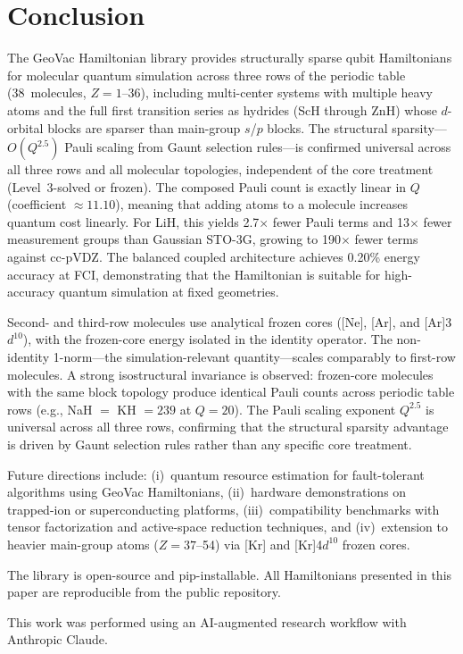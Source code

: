 \documentclass[twocolumn,pra,amsmath,amssymb,superscriptaddress]{revtex4-2}
\begin{document}
\section{Conclusion}
\label{sec:conclusion}

The GeoVac Hamiltonian library provides structurally sparse qubit
Hamiltonians for molecular quantum simulation across three rows
of the periodic table (38~molecules, $Z = 1$--36), including
multi-center systems with multiple heavy atoms and the full first
transition series as hydrides (ScH through ZnH) whose $d$-orbital blocks are sparser than
main-group $s$/$p$ blocks.  The
structural sparsity---$O(Q^{2.5})$ Pauli scaling from Gaunt selection
rules---is confirmed universal across all three rows and all molecular
topologies, independent of the core treatment (Level~3-solved or frozen).
The composed Pauli count is exactly linear in $Q$ (coefficient
$\approx 11.10$), meaning that adding atoms to a molecule increases
quantum cost linearly.
For LiH, this yields 2.7$\times$ fewer Pauli terms
and 13$\times$ fewer measurement groups than Gaussian STO-3G, growing
to 190$\times$ fewer terms against cc-pVDZ.  The balanced coupled
architecture achieves 0.20\% energy accuracy at FCI, demonstrating
that the Hamiltonian is suitable for high-accuracy quantum simulation
at fixed geometries.

Second- and third-row molecules use analytical frozen cores
([Ne], [Ar], and [Ar]3$d^{10}$), with the frozen-core energy
isolated in the identity operator.  The non-identity 1-norm---the
simulation-relevant quantity---scales comparably to first-row
molecules.  A strong isostructural invariance is observed:
frozen-core molecules with the same block topology produce
identical Pauli counts across periodic table rows (e.g.,
NaH $=$ KH $= 239$ at $Q = 20$).
The Pauli scaling exponent $Q^{2.5}$ is universal across all three
rows, confirming that the structural sparsity advantage is driven by
Gaunt selection rules rather than any specific core treatment.

Future directions include: (i)~quantum resource estimation for
fault-tolerant algorithms using GeoVac Hamiltonians, (ii)~hardware
demonstrations on trapped-ion or superconducting platforms,
(iii)~compatibility benchmarks with tensor factorization and
active-space reduction techniques, and (iv)~extension to heavier main-group atoms
($Z = 37$--54) via [Kr] and [Kr]4$d^{10}$ frozen cores.

The library is open-source and pip-installable. All Hamiltonians
presented in this paper are reproducible from the public repository.

\begin{acknowledgments}
This work was performed using an AI-augmented research workflow
with Anthropic Claude.
\end{acknowledgments}


\end{document}
